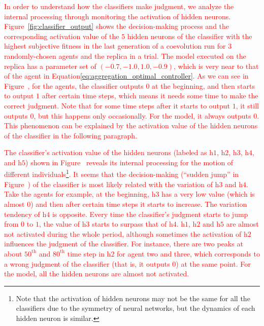 \textcolor{red}{In order to understand how the classifiers make judgment, we analyze the internal processing through monitoring the activation of hidden neurons. Figure~\ref{fig:classifier_output} shows the decision-making process and the corresponding activation value of the $5$ hidden neurons of the classifier with the highest subjective fitness in the last generation of a coevolution run for $3$ randomly-chosen agents and the replica in a trial. The model executed on the replica has a parameter set of $(-0.7, -1.0, 1.0, -0.9)$, which is very near to that of the agent in Equation\eqref{eq:aggregation_optimal_controller}. As we can see in Figure~, for the agents, the classifier outputs $0$ at the beginning, and then starts to output $1$ after certain time steps, which means it needs some time to make the correct judgment. Note that for some time steps after it starts to output $1$, it still outputs $0$, but this happens only occasionally. For the model, it always outputs $0$.  This phenomenon can be explained by the activation value of the hidden neurons of the classifier in the following paragraph.}

\textcolor{red}{The classifier's activation value of the hidden neurons (labeled as $\textrm{h}1$, $\textrm{h}2$, $\textrm{h}3$, $\textrm{h}4$, and $\textrm{h}5$) shown in Figure~ reveals its internal processing for the motion of different individuals\footnote{Note that the activation of hidden neurons may not be the same for all the classifiers due to the symmetry of neural networks, but the dynamics of each hidden neuron is similar.}. It seems that the decision-making (``sudden jump'' in Figure~) of the classifier is most likely related with the variation of $\textrm{h}3$ and $\textrm{h}4$. Take the agents for example, at the beginning, $\textrm{h}3$ has a very low value (which is almost $0$) and then after certain time steps it starts to increase. The variation tendency of $\textrm{h}4$ is opposite.  Every time the classifier's judgment starts to jump from $0$ to $1$, the value of $\textrm{h}3$ starts to surpass that of $\textrm{h}4$. $\textrm{h}1$, $\textrm{h}2$ and $\textrm{h}5$ are almost not activated during the whole period, although sometimes the activation of $\textrm{h}2$ influences the judgment of the classifier. For instance, there are two peaks at about $50^\textrm{th}$ and $80^\textrm{th}$ time step in $\textrm{h}2$ for agent two and three, which corresponds to a wrong judgment of the classifier (that is, it outputs $0$) at the same point. For the model, all the hidden neurons are almost not activated.}

